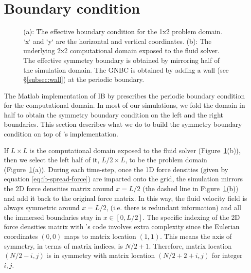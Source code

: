 \documentclass{jfm}
\begin{document}
\section {Boundary condition} \label{sec:bc}
\begin{figure}
\centering
{}\quad
{}\quad
\caption{\footnotesize (a): The effective boundary condition for the 1x2 problem domain. `x` and `y` are the horizontal and vertical coordinates. (b): The underlying 2x2 computational domain exposed to the fluid solver. The effective symmetry boundary is obtained by mirroring half of the simulation domain. The GNBC is obtained by adding a wall (see \S\ref{subsec:wall}) at the periodic boundary.}
\label{fig:domain}
\end{figure}
The Matlab implementation of IB by \cite{ib_matlab} prescribes the periodic boundary condition for the computational domain. In most of our simulations, we fold the domain in half to obtain the symmetry boundary condition on the left and the right boundaries. This section describes what we do to build the symmetry boundary condition on top of \cite{ib_matlab}'s implementation. 

If $L \times L$ is the computational domain exposed to the fluid solver (Figure~\ref{fig:domain}(b)), then we select the left half of it, $L/2 \times L$, to be the problem domain (Figure~\ref{fig:domain}(a)). During each time-step, once the 1D force densities (given by equation \ref{eq:ib-spread-force}) are imparted onto the grid, the simulation mirrors the 2D force densities matrix around $x = L/2$ (the dashed line in Figure~\ref{fig:domain}(b)) and add it back to the original force matrix. In this way, the fluid velocity field is always symmetric around $x = L/2$, (i.e. there is redundant information) and all the immersed boundaries stay in $x \in [0, L/2]$. The specific indexing of the 2D force densities matrix with \cite{ib_matlab}'s code involves extra complexity since the Eulerian coordinates $(0, 0)$ maps to matrix location $(1, 1)$. This means the axis of symmetry, in terms of matrix indices, is $N / 2 + 1$. Therefore, matrix location $(N / 2 - i, j)$ is in symmetry with matrix location $(N / 2 + 2 + i, j)$ for integer $i, j$. 

\end{document}
